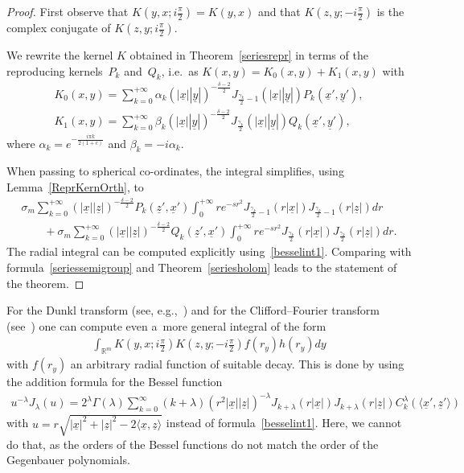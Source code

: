 \documentclass[pdftex]{sigma}
\numberwithin{equation}{section}
\numberwithin{theorem}{section}
\numberwithin{proposition}{section}
\numberwithin{lemma}{section}
\numberwithin{corollary}{section}
\numberwithin{definition}{section}
\numberwithin{example}{section}
\numberwithin{remark}{section}
\numberwithin{note}{section}
\theoremstyle{remark}
\newcommand{\mR}{\mathbb{R}}
\newcommand{\ux}{\underline{x}}
\newcommand{\uz}{\underline{z}}
\newcommand{\uy}{\underline{y}}
\def\l{{\lambda}}
\def\s{{\sigma}}
\def\la{{\langle}}
\def\ra{{\rangle}}
\begin{document}
\begin{proof}
First observe that $K\left(y,x;i\frac{\pi}{2}\right)=K(y,x)$ and that $K(z,y;-i\frac{\pi}{2})$ is the
complex conjugate of $K\left(z,y;i\frac{\pi}{2}\right)$.

We rewrite the kernel $K$ obtained in Theorem~\ref{seriesrepr} in terms of the reproducing kernels~$P_{k}$ and~$Q_{k}$, i.e.\
as $K(x,y)=K_{0}(x,y)+K_{1}(x,y)$ with
\begin{gather*}%
K_{0}(x,y) = \sum_{k=0}^{+\infty} \alpha_{k} \left( |\ux| |\uy|\right)^{-\frac{\delta-2}{2}}
J_{\frac{\gamma_{k}}{2} -1}(|\ux| |\uy|) P_{k}(\ux', \uy'),\\
K_{1}(x,y) = \sum_{k=0}^{+\infty} \beta_{k} \left( |\ux| |\uy|\right)^{-\frac{\delta-2}{2}}
J_{\frac{\gamma_{k}}{2}}(|\ux| |\uy|) Q_{k}(\ux', \uy'),
\end{gather*}
where $\alpha_{k}=e^{-\frac{i\pi k}{2(1+c)}}$ and $\beta_{k}=-i\alpha_{k}$.

When passing to spherical co-ordinates, the integral simplif\/ies, using Lemma~\ref{ReprKernOrth}, to
\begin{gather*}
\s_{m} \sum_{k=0}^{+\infty} \left( |\ux| |\uz|\right)^{-\frac{\delta-2}{2}} P_{k} (\uz', \ux')
\int_{0}^{+\infty} r e^{- s r^{2}} J_{\frac{\gamma_{k}}{2}-1} (r |\ux|)J_{\frac{\gamma_{k}}{2}-1}
(r |\uz|) dr\\
\qquad
{}+ \s_{m} \sum_{k=0}^{+\infty} \left( |\ux| |\uz|\right)^{-\frac{\delta-2}{2}} Q_{k} (\uz', \ux')
\int_{0}^{+\infty} r e^{- s r^{2}} J_{\frac{\gamma_{k}}{2}} (r |\ux|)J_{\frac{\gamma_{k}}{2}} (r
|\uz|) dr.
\end{gather*}
The radial integral can be computed explicitly using~\eqref{besselint1}.
Comparing with formula~\eqref{seriessemigroup} and Theorem~\ref{seriesholom} leads to the statement
of the theorem.
\end{proof}

\begin{remark}
For the Dunkl transform (see, e.g.,~\cite{MR1973996, MR2274972}) and for the Clif\/ford--Fourier
transform (see~\cite{DBXu}) one can compute even a~more general integral of the form
\begin{gather*}
\int_{\mR^{m}}K\left(y,x;i\frac{\pi}{2}\right)K\left(z,y;-i\frac{\pi}{2}\right)f(r_{y})h(r_{y})dy
\end{gather*}
with $f(r_{y})$ an arbitrary radial function of suitable decay.
This is done by using the addition formula for the Bessel function
\begin{gather*}
u^{-\l}J_{\l}(u)=2^{\l}\Gamma(\l)\sum_{k=0}^{\infty}(k+\l)(r^{2}|\ux||\uz|)^{-\l}J_{k+\l}(r
|\ux|)J_{k+\l}(r|\uz|)C^{\l}_{k}(\la\ux',\uz'\ra)
\end{gather*}
with $u=r\sqrt{|\ux|^{2}+|\uz|^{2}-2\la\ux,\uz\ra}$ instead of formula~\eqref{besselint1}.
Here, we cannot do that, as the orders of the Bessel functions do not match the order of the
Gegenbauer polynomials.
\end{remark}
\end{document}

